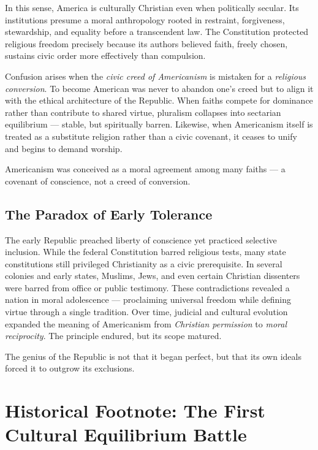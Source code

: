 \documentclass[12pt,twoside]{book}
\begin{document}
In this sense, America is culturally Christian even when politically secular.  
Its institutions presume a moral anthropology rooted in restraint, forgiveness, stewardship, and equality before a transcendent law.  
The Constitution protected religious freedom precisely because its authors believed faith, freely chosen, sustains civic order more effectively than compulsion.

Confusion arises when the \emph{civic creed of Americanism} is mistaken for a \emph{religious conversion}.  
To become American was never to abandon one’s creed but to align it with the ethical architecture of the Republic.  
When faiths compete for dominance rather than contribute to shared virtue, pluralism collapses into sectarian equilibrium — stable, but spiritually barren.  
Likewise, when Americanism itself is treated as a substitute religion rather than a civic covenant, it ceases to unify and begins to demand worship.

\begin{keyidea}
Americanism was conceived as a moral agreement among many faiths — a covenant of conscience, not a creed of conversion.
\end{keyidea}

\subsection*{The Paradox of Early Tolerance}

The early Republic preached liberty of conscience yet practiced selective inclusion.  
While the federal Constitution barred religious tests, many state constitutions still privileged Christianity as a civic prerequisite.  
In several colonies and early states, Muslims, Jews, and even certain Christian dissenters were barred from office or public testimony.  
These contradictions revealed a nation in moral adolescence — proclaiming universal freedom while defining virtue through a single tradition.  
Over time, judicial and cultural evolution expanded the meaning of Americanism from \emph{Christian permission} to \emph{moral reciprocity}.  
The principle endured, but its scope matured.

\begin{keyidea}
The genius of the Republic is not that it began perfect, but that its own ideals forced it to outgrow its exclusions.
\end{keyidea}


\section{Historical Footnote: The First Cultural Equilibrium Battle}
\end{document}
